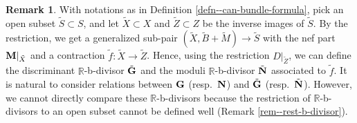 \documentclass[12pt]{amsart}
\theoremstyle{definition}
\newtheorem{rem}[thm]{Remark}
\begin{document}
\begin{rem}\label{rem--can-bundle-formula-rest}
With notations as in Definition \ref{defn--can-bundle-formula}, pick an open subset $\tilde{S} \subset S$, and let $\tilde{X} \subset X$ and $\tilde{Z} \subset Z$ be the inverse images of $\tilde{S}$. 
By the restriction, we get a generalized sub-pair $(\tilde{X},\tilde{B}+\tilde{M}) \to \tilde{S}$ with the nef part $\boldsymbol{\rm M}|_{\tilde{X}}$ and a contraction $\tilde{f} \colon \tilde{X} \to \tilde{Z}$. 
Hence, using the restriction $D|_{\tilde{Z}}$, we can define the discriminant $\mathbb{R}$-b-divisor $\tilde{\boldsymbol{\rm G}}$ and the moduli $\mathbb{R}$-b-divisor $\tilde{\boldsymbol{\rm N}}$ associated to $\tilde{f}$. 
It is  natural to consider relations between $\boldsymbol{\rm G}$ (resp.~$\boldsymbol{\rm N}$) and $\tilde{\boldsymbol{\rm G}}$ (resp.~$\tilde{\boldsymbol{\rm N}}$). 
However, we cannot directly compare these $\mathbb{R}$-b-divisors because the restriction of $\mathbb{R}$-b-divisors to an open subset cannot be defined well (Remark \ref{rem--rest-b-divisor}). 
\end{rem}
\end{document}

